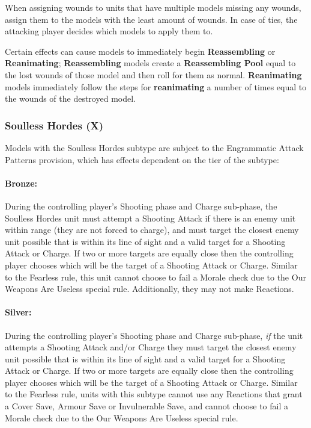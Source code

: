 \begin{multicols}{2}
When assigning wounds to units that have multiple models missing any wounds, assign them to the models with the least amount of wounds. In case of ties, the attacking player decides which models to apply them to.

Certain effects can cause models to immediately begin \textbf{Reassembling} or \textbf{Reanimating}; \textbf{Reassembling} models create a \textbf{Reassembling Pool} equal to the lost wounds of those model and then roll for them as normal. \textbf{Reanimating} models immediately follow the steps for \textbf{reanimating} a number of times equal to the wounds of the destroyed model.

\subsubsection{Soulless Hordes (X)} \label{Soulless Hordes}

Models with the Soulless Hordes subtype are subject to the Engrammatic Attack Patterns provision, which has effects dependent on the tier of the subtype:

\paragraph{Bronze:} During the controlling player's Shooting phase and Charge sub-phase, the Soulless Hordes unit must attempt a Shooting Attack if there is an enemy unit within range (they are not forced to charge), and must target the closest enemy unit possible that is within its line of sight and a valid target for a Shooting Attack or Charge. If two or more targets are equally close then the controlling player chooses which will be the target of a Shooting Attack or Charge. Similar to the Fearless rule, this unit cannot choose to fail a Morale check due to the Our Weapons Are Useless special rule. Additionally, they may not make Reactions.

\paragraph{Silver:} During the controlling player's Shooting phase and Charge sub-phase, \textit{if} the unit attempts a Shooting Attack and/or Charge they must target the closest enemy unit possible that is within its line of sight and a valid target for a Shooting Attack or Charge. If two or more targets are equally close then the controlling player chooses which will be the target of a Shooting Attack or Charge. Similar to the Fearless rule, units with this subtype cannot use any Reactions that grant a Cover Save, Armour Save or Invulnerable Save, and cannot choose to fail a Morale check due to the Our Weapons Are Useless special rule.


\end{multicols}
